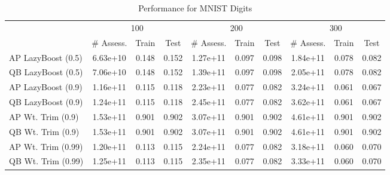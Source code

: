\begin{table*}[ht]
\caption{Performance for MNIST Digits}
\label{tbl:perf-mnist}
\vskip 0.15in
\begin{center}
\begin{small}
\begin{sc}
\begin{tabular}{lccccccccc}
\toprule
	& \multicolumn{3}{c}{100}
	& \multicolumn{3}{c}{200}
	& \multicolumn{3}{c}{300}
	\\
 & \# Assess. & Train & Test & \# Assess. & Train & Test & \# Assess. & Train & Test \\
\midrule
AP LazyBoost (0.5) & 6.63e+10 & 0.148 & 0.152 & 1.27e+11 & 0.097 & 0.098 & 1.84e+11 & 0.078 & 0.082 \\
QB LazyBoost (0.5) & 7.06e+10 & 0.148 & 0.152 & 1.39e+11 & 0.097 & 0.098 & 2.05e+11 & 0.078 & 0.082 \\
AP LazyBoost (0.9) & 1.16e+11 & 0.115 & 0.118 & 2.23e+11 & 0.077 & 0.082 & 3.24e+11 & 0.061 & 0.067 \\
QB LazyBoost (0.9) & 1.24e+11 & 0.115 & 0.118 & 2.45e+11 & 0.077 & 0.082 & 3.62e+11 & 0.061 & 0.067 \\
AP Wt. Trim (0.9) & 1.53e+11 & 0.901 & 0.902 & 3.07e+11 & 0.901 & 0.902 & 4.61e+11 & 0.901 & 0.902 \\
QB Wt. Trim (0.9) & 1.53e+11 & 0.901 & 0.902 & 3.07e+11 & 0.901 & 0.902 & 4.61e+11 & 0.901 & 0.902 \\
AP Wt. Trim (0.99) & 1.20e+11 & 0.113 & 0.115 & 2.24e+11 & 0.077 & 0.082 & 3.18e+11 & 0.060 & 0.070 \\
QB Wt. Trim (0.99) & 1.25e+11 & 0.113 & 0.115 & 2.35e+11 & 0.077 & 0.082 & 3.33e+11 & 0.060 & 0.070 \\
\bottomrule
\end{tabular}
\end{sc}
\end{small}
\end{center}
\vskip -0.1in
\end{table*}

